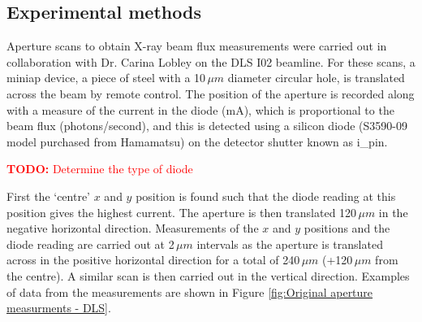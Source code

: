 \subsection{Experimental methods}
\label{sub:Experimental Methods - DLS}
Aperture scans to obtain X-ray beam flux measurements were carried out in collaboration with Dr. Carina Lobley on the DLS I02 beamline.
For these scans, a miniap device, a piece of steel with a 10$\,\mu m$ diameter circular hole, is translated across the beam by remote control.
The position of the aperture is recorded along with a measure of the current in the diode (mA), which is proportional to the beam flux (photons/second), and this is detected using a silicon diode (S3590-09 model purchased from Hamamatsu) on the detector shutter known as i\_pin.
\textcolor{red}{
    \begin{myenumerate}
        \item \hypertarget{todo:Type of diode}{\textbf{TODO:} Determine the type of diode}
    \end{myenumerate}
}
First the `centre' $x$ and $y$ position is found such that the diode reading at this position gives the highest current.
The aperture is then translated 120$\,\mu m$ in the negative horizontal direction.
Measurements of the $x$ and $y$ positions and the diode reading are carried out at 2$\,\mu m$ intervals as the aperture is translated across in the positive horizontal direction for a total of 240$\,\mu m$ (+120$\,\mu m$ from the centre).
A similar scan is then carried out in the vertical direction.
Examples of data from the measurements are shown in Figure \ref{fig:Original aperture measurments - DLS}.
